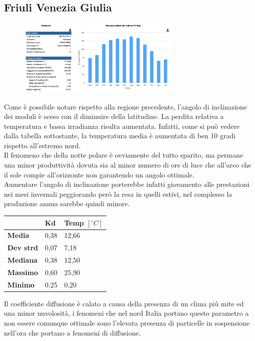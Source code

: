 \subsection{Friuli Venezia Giulia}
\begin{figure}[H]
    \centering
    \includegraphics[width=0.7\textwidth]{res/cap 5/impianto udine}
\end{figure}\noindent
Come è possibile notare rispetto alla regione precedente, l'angolo di inclinazione dei moduli è sceso con il diminuire della latitudine. La perdita relativa a temperatura e bassa irradianza risulta aumentata. Infatti, come si può vedere dalla tabella sottostante, la temperatura media è aumentata di ben 10 gradi rispetto all'estremo nord.\\
Il fenomeno che della notte polare è ovviamente del tutto sparito, ma permane una minor produttività dovuta sia al minor numero di ore di luce che all'arco che il sole compie all'orizzonte non garantendo un angolo ottimale.\\
Aumentare l'angolo di inclinazione porterebbe infatti giovamento alle prestazioni nei mesi invernali peggiorando però la resa in quelli estivi, nel complesso la produzione annua sarebbe quindi minore.
\begin{table}[H]
    \centering
    \begin{tabular}{|l|l|l|}
    \hline	
          & \textbf{Kd} & \textbf{Temp $[{}^\circ C]$} \\ \hline
        \textbf{Media} & 0,38 & 12,66 \\ \hline
        \textbf{Dev strd} & 0,07 & 7,18 \\ \hline
        \textbf{Mediana} & 0,38 & 12,50 \\ \hline
        \textbf{Massimo} & 0,60 & 25,90 \\ \hline
        \textbf{Minimo} & 0,25 & 0,20 \\ \hline
    \end{tabular}
\end{table}
Il coefficiente diffusione è calato a causa della presenza di un clima più mite ed una minor nuvolosità, i fenomeni che nel nord Italia portano questo parametro a non essere comunque ottimale sono l'elevata presenza di particelle in sospensione nell'ora che portano a fenomeni di diffusione.
\vfill
\newpage
